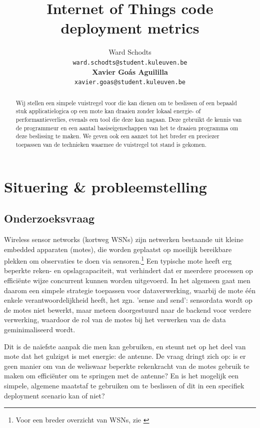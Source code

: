 \documentclass[11pt]{article}
\title{Internet of Things code deployment metrics}
\author{
  Ward Schodts\\
  \texttt{ward.schodts@student.kuleuven.be}
  \\[3ex]
  \textbf{Xavier Go\'as Aguililla}\\
  \texttt{xavier.goas@student.kuleuven.be}
}
\begin{document}
\maketitle

\listoftodos
\linespread{1.3}
\begin{abstract}
Wij stellen een simpele vuistregel voor die kan dienen om te beslissen of een
bepaald stuk applicatielogica op een mote kan draaien zonder lokaal energie- of
performantieverlies, evenals een tool die deze kan nagaan. Deze gebruikt de
kennis van de programmeur en een aantal basiseigenschappen van het te draaien
programma om deze beslissing te maken. We geven ook een aanzet tot het breder en
preciezer toepassen van de technieken waarmee de vuistregel tot stand is gekomen.
  
\end{abstract}

\section{Situering \& probleemstelling}

\subsection{Onderzoeksvraag}

Wireless sensor networks (kortweg WSNs) zijn netwerken bestaande uit kleine
embedded apparaten (motes), die worden geplaatst op moeilijk bereikbare plekken
om observaties te doen via sensoren.\footnote{Voor een breder overzicht van
WSNs, zie \cite{akyildiz2002wireless}} Een typische mote heeft erg beperkte
reken- en opslagcapaciteit, wat verhindert dat er meerdere processen op
effici\"ente wijze concurrent kunnen worden uitgevoerd. In het algemeen gaat men
daarom een simpele strategie toepassen voor dataverwerking, waarbij de mote
\'e\'en enkele verantwoordelijkheid heeft, het zgn. 'sense and send': sensordata
wordt op de motes niet bewerkt, maar meteen doorgestuurd naar de backend voor
verdere verwerking, waardoor de rol van de motes bij het verwerken van de data
geminimaliseerd wordt.

Dit is de na\"iefste aanpak die men kan gebruiken, en steunt net op het deel van
mote dat het gulzigst is met energie: de antenne.  De vraag dringt zich op: is
er geen manier om van de weliswaar beperkte rekenkracht van de motes gebruik te
maken om effici\"enter om te springen met de antenne? En is het mogelijk een
simpele, algemene maatstaf te gebruiken om te beslissen of dit in een specifiek
deployment scenario kan of niet?
\end{document}
